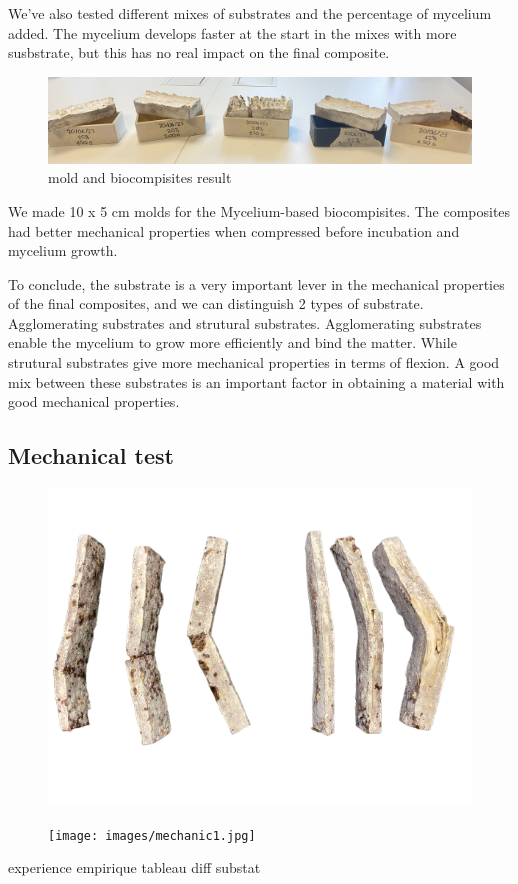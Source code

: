 We've also tested different mixes of substrates and the percentage of mycelium added. The mycelium develops faster at the start in the mixes with more susbstrate, but this has no real impact on the final composite. 


\begin{figure}[h]
    \centering
    \includegraphics{images/moule et MBC.jpg}
    \caption{mold and biocompisites result} 
    \label{fig:moldandresult}
\end{figure} 
We made 10 x 5 cm molds for the Mycelium-based biocompisites. The composites had better mechanical properties when compressed before incubation and mycelium growth. 

To conclude, the substrate is a very important lever in the mechanical properties of the final composites, and we can distinguish 2 types of substrate.  Agglomerating substrates and strutural substrates. 
Agglomerating substrates enable the mycelium to grow more efficiently and bind the matter.
While strutural substrates give more mechanical properties in terms of flexion. A good mix between these substrates is an important factor in obtaining a material with good mechanical properties. 


\subsection{Mechanical test}


\begin{figure}[h]
    \centering
    \includegraphics{images/IMG_1823-removebg-preview.png}
    \caption{}
    \label{fig:eprouvette}
\end{figure} 

\begin{figure}[h]
    \centering
    \texttt{[image: images/mechanic1.jpg]}
    \caption{}
    \label{fig:mechanic test machine}
\end{figure} 


experience empirique 
tableau diff substat 